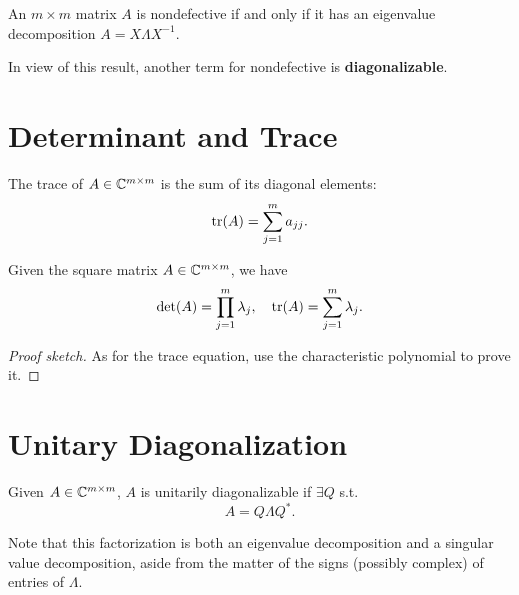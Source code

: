 \begin{theorem}
\label{thm: defective eig}
An $m\times m$ matrix $A$ is nondefective if and only if it has an eigenvalue decomposition $ A = X\Lambda X^{-1}  $. 
\end{theorem}

In view of this result, another term for nondefective is \textbf{diagonalizable}. 

\section{Determinant and Trace}

\begin{definition}
[trace]
\label{def: trace}
The trace of $A\in \mathbb{C}^{m\times m}$ is the sum of its diagonal elements:
\[
    \mathop{\mathrm{tr}}(A) = \sum_{j=1}^{m} a_{jj}. 
\]
\end{definition}


\begin{theorem}
\label{thm: det trace eig}
Given the square matrix $A\in\mathbb{C}^{m\times m}$, we have 
\begin{equation}
\label{eq: det trace eig}
\det (A) = \prod_{j=1}^m \lambda _j, \quad \mathop{\mathrm{tr}}(A) = \sum_{j=1}^{m} \lambda _j. 
\end{equation}
\end{theorem}
\begin{proof}[Proof sketch]
As for the trace equation, use the characteristic polynomial to prove it. 
\end{proof}

\section{Unitary Diagonalization} 

\begin{definition}
\label{def: Unitarily diagonalizable}
Given $A\in\mathbb{C}^{m\times m}$, $A$ is unitarily diagonalizable if $\exists Q$ s.t. 
\[
A = Q\Lambda Q^*.  
\] 

\end{definition}
Note that this factorization is both an eigenvalue decomposition and a singular value decomposition, aside from the matter of the signs (possibly complex) of entries of $\Lambda $. 


